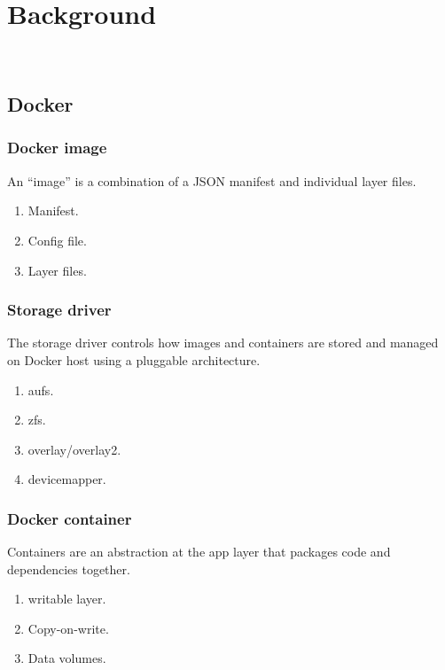 
\section{Background}

\\

\subsection{Docker}

\subsubsection{Docker image}

An “image” is a combination of a JSON manifest and individual layer files. 

\begin{enumerate}
	\item Manifest.
	\item Config file.
	\item Layer files.
\end{enumerate}

\subsubsection{Storage driver}

 The storage driver controls how images and containers are stored and managed on Docker host using a pluggable architecture. 

\begin{enumerate}
	\item aufs.
	\item zfs.
	\item overlay/overlay2.
	\item devicemapper.
\end{enumerate}

\subsubsection{Docker container}

Containers are an abstraction at the app layer that packages code and dependencies together. 

\begin{enumerate}
	\item writable layer.
	\item Copy-on-write.
	\item Data volumes.
\end{enumerate}

